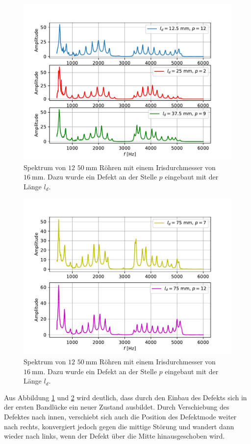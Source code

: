\begin{figure}
  \centering
  \includegraphics[scale=0.5]{Messwerte/plot18.pdf}
  \caption{Spektrum von $12$ $\SI{50}{\milli\meter}$ Röhren mit einem Irisdurchmesser von $\SI{16}{\milli\meter}$. Dazu wurde ein Defekt an der Stelle $p$ eingebaut
  mit der Länge $l_d$.}
  \label{fig:plot18}
\end{figure}
\begin{figure}
  \centering
  \includegraphics[scale=0.5]{Messwerte/plot19.pdf}
  \caption{Spektrum von $12$ $\SI{50}{\milli\meter}$ Röhren mit einem Irisdurchmesser von $\SI{16}{\milli\meter}$. Dazu wurde ein Defekt an der Stelle $p$ eingebaut
  mit der Länge $l_d$.}
  \label{fig:plot19}
\end{figure}
Aus Abbildung \ref{fig:plot18} und \ref{fig:plot19} wird deutlich, dass durch den Einbau des Defekts sich in der ersten Bandlücke ein neuer Zustand ausbildet.
Durch Verschiebung des Defektes nach innen, verschiebt sich auch die Position des Defektmode weiter nach rechts, konvergiert jedoch gegen die mittige Störung und wandert
dann wieder nach links, wenn der Defekt über die Mitte hinausgeschoben wird.
